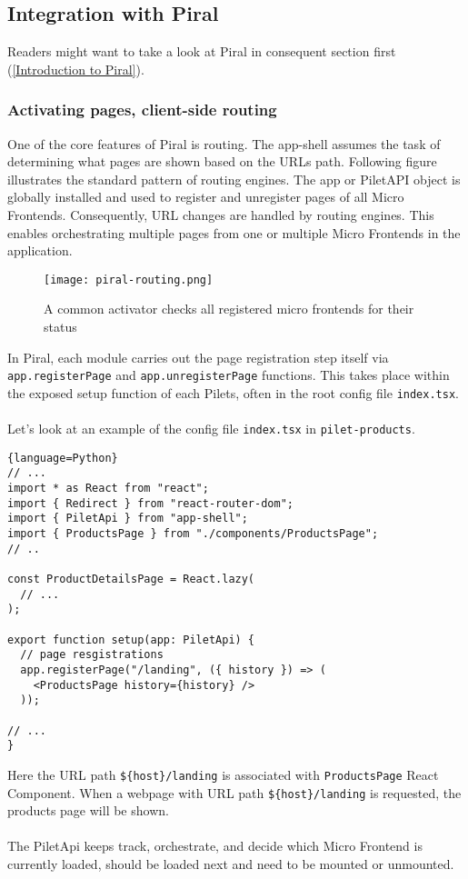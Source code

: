 \documentclass[a4paper]{book}
\begin{document}
\subsection{Integration with Piral}
Readers might want to take a look at Piral in consequent section first (\ref{Introduction to Piral}).
\subsubsection{Activating pages, client-side routing}
One of the core features of Piral is routing. The app-shell assumes the task of determining what pages are shown based on the URLs path. Following figure illustrates the standard pattern of routing engines. The app or PiletAPI object is globally installed and used to register and unregister pages of all Micro Frontends. Consequently, URL changes are handled by routing engines. This enables orchestrating multiple pages from one or multiple Micro Frontends in the application.
\begin{figure}[h!]
  \centering
  \captionsetup{justification=centering}
  \texttt{[image: piral-routing.png]}
  \caption{A common activator checks all registered micro frontends for their status \cite{Rap20}}
  \label{fig:piral-routing}
\end{figure}

In Piral, each module carries out the page registration step itself via \verb|app.registerPage| and \verb|app.unregisterPage| functions. This takes place within the exposed setup function of each Pilets, often in the root config file \verb|index.tsx|.
\\ \\
Let’s look at an example of the config file \verb|index.tsx| in \verb|pilet-products|.

\begin{lstlisting}{language=Python}
// ...
import * as React from "react";
import { Redirect } from "react-router-dom";
import { PiletApi } from "app-shell";
import { ProductsPage } from "./components/ProductsPage";
// ..

const ProductDetailsPage = React.lazy(
  // ...
);

export function setup(app: PiletApi) {
  // page resgistrations
  app.registerPage("/landing", ({ history }) => (
    <ProductsPage history={history} />
  ));

// ...
}
\end{lstlisting}

Here the URL path \verb|${host}/landing| is associated with \verb|ProductsPage| React Component. When a webpage with URL path \verb|${host}/landing| is requested, the products page will be shown.
\\ \\
The PiletApi keeps track, orchestrate, and decide which Micro Frontend is currently loaded, should be loaded next and need to be mounted or unmounted.
\end{document}
